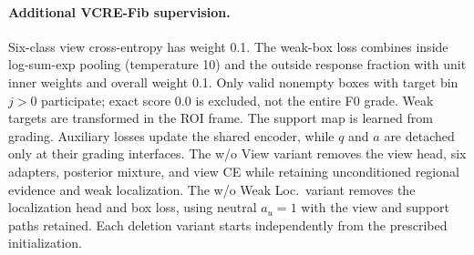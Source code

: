 \paragraph{Additional VCRE-Fib supervision.}
Six-class view cross-entropy has weight 0.1. The weak-box loss combines inside log-sum-exp pooling (temperature 10) and the outside response fraction with unit inner weights and overall weight 0.1. Only valid nonempty boxes with target bin $j>0$ participate; exact score 0.0 is excluded, not the entire F0 grade. Weak targets are transformed in the ROI frame. The support map is learned from grading. Auxiliary losses update the shared encoder, while $q$ and $a$ are detached only at their grading interfaces. The w/o View variant removes the view head, six adapters, posterior mixture, and view CE while retaining unconditioned regional evidence and weak localization. The w/o Weak Loc.\ variant removes the localization head and box loss, using neutral $a_u=1$ with the view and support paths retained. Each deletion variant starts independently from the prescribed initialization.

